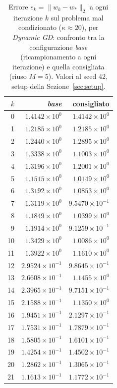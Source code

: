 \begin{table}[H]
\centering
\footnotesize
\renewcommand{\arraystretch}{0.85}
\setlength{\tabcolsep}{8pt}
\caption{Errore $e_k=\|w_k-w_*\|_2$ a ogni iterazione $k$ sul problema mal condizionato ($\kappa\approx 20$), per \emph{Dynamic GD}: confronto tra la configurazione \emph{base} (ricampionamento a ogni iterazione) e quella consigliata (riuso $M{=}5$). Valori al seed 42, setup della Sezione~\ref{sec:setup}.}
\label{tab:riuso_cons_malcond_gd}
\begin{tabular}{@{}rrr@{}}
\toprule
$k$ & \emph{base} & consigliato\\
\midrule
0 & $1.4142\times10^{0}$ & $1.4142\times10^{0}$\\
1 & $1.2185\times10^{0}$ & $1.2185\times10^{0}$\\
2 & $1.2440\times10^{0}$ & $1.2895\times10^{0}$\\
3 & $1.3338\times10^{0}$ & $1.1003\times10^{0}$\\
4 & $1.3196\times10^{0}$ & $1.2001\times10^{0}$\\
5 & $1.1515\times10^{0}$ & $1.0149\times10^{0}$\\
6 & $1.3192\times10^{0}$ & $1.0853\times10^{0}$\\
7 & $1.3119\times10^{0}$ & $9.5470\times10^{-1}$\\
8 & $1.1849\times10^{0}$ & $1.0399\times10^{0}$\\
9 & $1.1914\times10^{0}$ & $9.1259\times10^{-1}$\\
10 & $1.3429\times10^{0}$ & $1.0086\times10^{0}$\\
11 & $1.3922\times10^{0}$ & $1.1610\times10^{0}$\\
12 & $2.9524\times10^{-1}$ & $9.8645\times10^{-1}$\\
13 & $2.6608\times10^{-1}$ & $1.1455\times10^{0}$\\
14 & $2.3965\times10^{-1}$ & $9.7151\times10^{-1}$\\
15 & $2.1588\times10^{-1}$ & $1.1350\times10^{0}$\\
16 & $1.9451\times10^{-1}$ & $2.1297\times10^{-1}$\\
17 & $1.7531\times10^{-1}$ & $1.7879\times10^{-1}$\\
18 & $1.5805\times10^{-1}$ & $1.6101\times10^{-1}$\\
19 & $1.4254\times10^{-1}$ & $1.4502\times10^{-1}$\\
20 & $1.2862\times10^{-1}$ & $1.3065\times10^{-1}$\\
21 & $1.1613\times10^{-1}$ & $1.1772\times10^{-1}$\\

\end{tabular}
\end{table}
